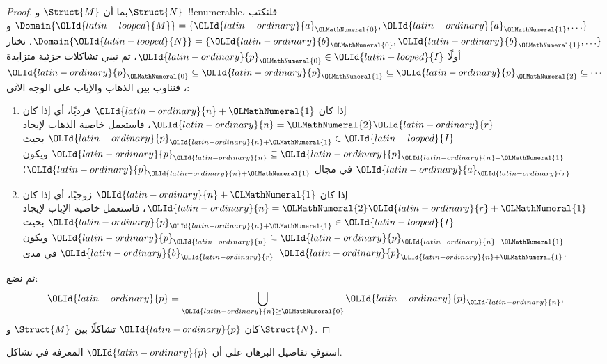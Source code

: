 \documentclass[../../../include/open-logic-section]{subfiles}
\begin{document}
\begin{proof}
  بما أن $\Struct{M}$ و$\Struct{N}$~!!{enumerable}، فلنكتب
  $\Domain{\OLId{latin-looped}{M}} = \{\OLId{latin-ordinary}{a}_\OLMathNumeral{0}, \OLId{latin-ordinary}{a}_\OLMathNumeral{1}, \ldots \}$ و
  $\Domain{\OLId{latin-looped}{N}} = \{\OLId{latin-ordinary}{b}_\OLMathNumeral{0}, \OLId{latin-ordinary}{b}_\OLMathNumeral{1}, \ldots \}$. نختار أولًا $\OLId{latin-ordinary}{p}_\OLMathNumeral{0} \in \OLId{latin-looped}{I}$،
  ثم نبني تشاكلات جزئية متزايدة
  $\OLId{latin-ordinary}{p}_\OLMathNumeral{0} \subseteq \OLId{latin-ordinary}{p}_\OLMathNumeral{1} \subseteq \OLId{latin-ordinary}{p}_\OLMathNumeral{2} \subseteq \cdots$، فنناوب
  بين الذهاب والإياب على الوجه الآتي:
  \begin{enumerate}
  \item إذا كان $\OLId{latin-ordinary}{n}+\OLMathNumeral{1}$ فرديًا، أي إذا كان $\OLId{latin-ordinary}{n} = \OLMathNumeral{2}\OLId{latin-ordinary}{r}$، فاستعمل خاصية الذهاب
    لإيجاد $\OLId{latin-ordinary}{p}_{\OLId{latin-ordinary}{n}+\OLMathNumeral{1}} \in \OLId{latin-looped}{I}$ بحيث $\OLId{latin-ordinary}{p}_\OLId{latin-ordinary}{n} \subseteq \OLId{latin-ordinary}{p}_{\OLId{latin-ordinary}{n}+\OLMathNumeral{1}}$ ويكون $\OLId{latin-ordinary}{a}_\OLId{latin-ordinary}{r}$
    في مجال $\OLId{latin-ordinary}{p}_{\OLId{latin-ordinary}{n}+\OLMathNumeral{1}}$؛
  \item إذا كان $\OLId{latin-ordinary}{n}+\OLMathNumeral{1}$ زوجيًا، أي إذا كان $\OLId{latin-ordinary}{n}=\OLMathNumeral{2}\OLId{latin-ordinary}{r}+\OLMathNumeral{1}$، فاستعمل خاصية الإياب
    لإيجاد $\OLId{latin-ordinary}{p}_{\OLId{latin-ordinary}{n}+\OLMathNumeral{1}} \in \OLId{latin-looped}{I}$ بحيث $\OLId{latin-ordinary}{p}_\OLId{latin-ordinary}{n} \subseteq \OLId{latin-ordinary}{p}_{\OLId{latin-ordinary}{n}+\OLMathNumeral{1}}$ ويكون $\OLId{latin-ordinary}{b}_\OLId{latin-ordinary}{r}$
    في مدى $\OLId{latin-ordinary}{p}_{\OLId{latin-ordinary}{n}+\OLMathNumeral{1}}$.
  \end{enumerate}
ثم نضع:
\[
\OLId{latin-ordinary}{p} = \bigcup_{\OLId{latin-ordinary}{n}\ge \OLMathNumeral{0}} \OLId{latin-ordinary}{p}_\OLId{latin-ordinary}{n},
\]
كان $\OLId{latin-ordinary}{p}$ تشاكلًا بين $\Struct{M}$ و$\Struct{N}$.
\end{proof}

\begin{prob}
  استوفِ تفاصيل البرهان على أن $\OLId{latin-ordinary}{p}$ المعرفة في
   تشاكل.
\end{prob}
\end{document}
